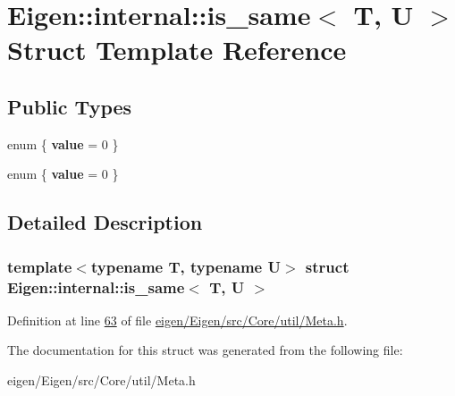 \hypertarget{struct_eigen_1_1internal_1_1is__same}{}\section{Eigen\+:\+:internal\+:\+:is\+\_\+same$<$ T, U $>$ Struct Template Reference}
\label{struct_eigen_1_1internal_1_1is__same}
\subsection*{Public Types}
\begin{DoxyCompactItemize}
\item 
\mbox{\label{struct_eigen_1_1internal_1_1is__same_aaf706815c3613e2e7a66aa211bec894b}} 
enum \{ {\bfseries value} = 0
 \}
\item 
\mbox{\label{struct_eigen_1_1internal_1_1is__same_a472413ca6e0f26047183a7b200a79cb0}} 
enum \{ {\bfseries value} = 0
 \}
\end{DoxyCompactItemize}


\subsection{Detailed Description}
\subsubsection*{template$<$typename T, typename U$>$\newline
struct Eigen\+::internal\+::is\+\_\+same$<$ T, U $>$}



Definition at line \hyperlink{eigen_2_eigen_2src_2_core_2util_2_meta_8h_source_l00063}{63} of file \hyperlink{eigen_2_eigen_2src_2_core_2util_2_meta_8h_source}{eigen/\+Eigen/src/\+Core/util/\+Meta.\+h}.



The documentation for this struct was generated from the following file\+:\begin{DoxyCompactItemize}
\item 
eigen/\+Eigen/src/\+Core/util/\+Meta.\+h\end{DoxyCompactItemize}
